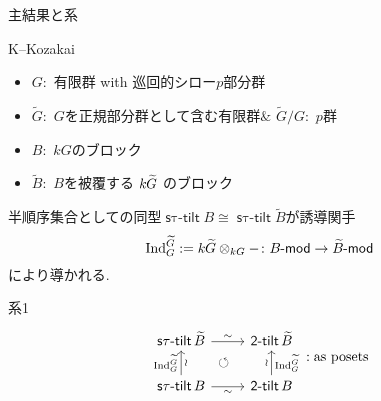 \documentclass[dvipdfmx,10pt,handout
]{beamer}
\newcommand{\lmod}{\operatorname{\mathsf{\hspace{-2pt}-mod}}}
\newcommand{\twotilt}{\operatorname{\mathsf{2-tilt}}}
\newcommand{\induc}{{\operatorname{Ind}\nolimits}}
\newcommand{\stautilt}{\operatorname{\mathsf{s\tau-tilt}}}
\newcommand{\sbrick}{\operatorname{\mathsf{sbrick}}}
\newcommand{\inertiagp}{I}
\begin{document}
\begin{frame}
    {主結果と系}
    \begin{block}{K--Kozakai}
        \begin{itemize}
            \item \(G:\) 有限群 with 巡回的シロー\(p\)部分群
            \item $\widetilde{G}:$ \(G\)を正規部分群として含む有限群\(\&\) \(\widetilde{G}/G:\) \(p\)群
            \item \(B:\) \(kG\)のブロック
            \item ${\widetilde B}:$ $B$を被覆する $k\hspace{-0.3pt}\widetilde{G}$ のブロック%
        \end{itemize}\pause
        半順序集合としての同型$\stautilt B \cong \stautilt {\widetilde B}$が誘導関手 \[\induc_G^{\widetilde G}:=k\hspace{-0.3pt}{\widetilde G}\otimes_{kG}-\colon B\lmod\rightarrow \widetilde{B}\lmod\]により導かれる.
    \end{block}
    \pause
    \begin{block}
        {系1}\vspace{-5pt}
        \[
            \begin{tikzcd}[ampersand replacement=\&]
                \stautilt {\widetilde B}\ar[r,"\sim"]\ar[rd,phantom,"\circlearrowleft"]\&\twotilt {\widetilde B}\\
                \stautilt B \ar[r,"\sim"'] \ar[u,"\induc_G^{\widetilde{G}}","\wr "']\&\twotilt {B}\ar[u,"\wr","\induc_G^{\widetilde{G}}"']
            \end{tikzcd}:\text{as posets}
        \]
    \end{block}

\end{frame}
\end{document}
